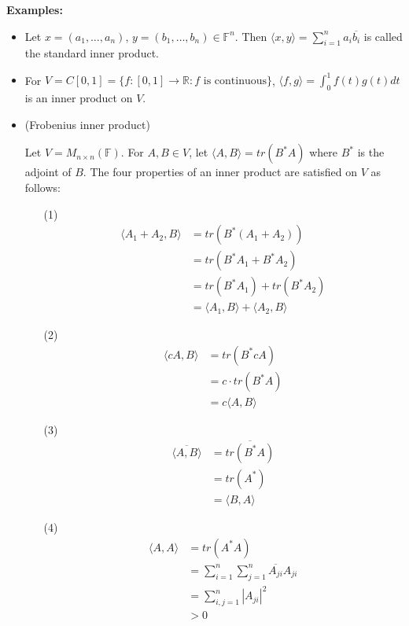 \documentclass[12pt]{article}
\begin{document}
\noindent\textbf{Examples:}
\begin{itemize}
    \item Let $x = (a_1, \dots, a_n)$, $y = (b_1, \dots, b_n) \in \mathbb{F}^n$. Then $\langle x, y \rangle = \sum_{i = 1}^na_i\overline{b_i}$ is called the standard inner product.
    
    \item For $V = C[0,1] = \{f : [0,1] \to \mathbb{R} : f \text{ is continuous}\}$, $\langle f, g \rangle = \int_0^1f(t)g(t)dt$ is an inner product on $V$. 
    
    \item (Frobenius inner product)
    
    Let $V = M_{n \times n}(\mathbb{F})$. For $A, B \in V$, let $\langle A, B \rangle = tr(B^*A)$ where $B^*$ is the adjoint of $B$. The four properties of an inner product are satisfied on $V$ as follows:
    
    \begin{itemize}
    \item[(1)] \begin{align*}
        \langle A_1 + A_2, B \rangle &= tr(B^*(A_1 + A_2)) \\
        &= tr(B^*A_1 + B^*A_2) \\
        &= tr(B^*A_1) + tr(B^*A_2) \\
        &= \langle A_1, B \rangle + \langle A_2, B \rangle
    \end{align*}
    
        \item[(2)] \begin{align*}
            \langle cA, B \rangle &= tr(B^*cA) \\
            &= c \cdot tr(B^*A) \\
            &= c \langle A, B \rangle
        \end{align*}
        
        \item[(3)] \begin{align*}
            \overline{\langle A, B \rangle} &= \overline{tr(B^*A)} \\
            &= tr(A^*) \\
            &= \langle B, A \rangle
        \end{align*}
        
        \item[(4)] \begin{align*}
            \langle A, A \rangle &= tr(A^*A) \\
            &= \sum_{i = 1}^n\sum_{j = 1}^n\overline{A_{ji}}A_{ji} \\
            &= \sum_{i,j = 1}^n \left| A_{ji} \right|^2 \\
            &> 0 \tag{When $A \neq 0$}
        \end{align*}
    \end{itemize}
\end{itemize}
\end{document}
